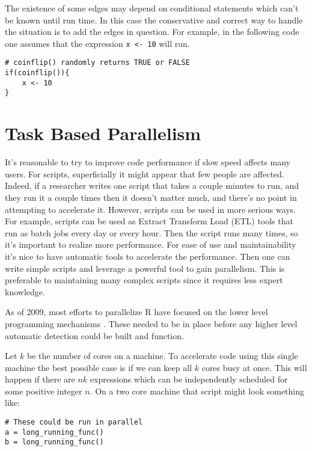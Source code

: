 \documentclass[12pt]{article}
\begin{document}
The existence of some edges may depend on conditional statements which can't
be known until run time. In this case the conservative and correct way to
handle the situation is to add the edges in question. For example, in the
following code one assumes that the expression \texttt{x <- 10} will run.

\begin{verbatim}
# coinflip() randomly returns TRUE or FALSE
if(coinflip()){
    x <- 10
}
\end{verbatim}

\section{Task Based Parallelism}

It's reasonable to try to improve code performance if slow speed affects
many users. For scripts, superficially it might appear that few people are
affected. Indeed, if a researcher writes one script that takes a couple
minutes to run, and they run it a couple times then it doesn't matter much,
and there's no point in attempting to accelerate it.  However, 
scripts can be used in more serious ways.  For example, scripts
can be used as Extract Transform Load (ETL) tools that run as batch jobs
every day or every hour. Then the script runs many times, so it's important
to realize more performance. For ease of use and maintainability it's nice
to have automatic tools to accelerate the performance. Then one can write
simple scripts and leverage a powerful tool to gain parallelism. This is
preferable to maintaining many complex scripts since it requires less
expert knowledge.

As of 2009, most efforts to parallelize R have focused on the lower level
programming mechanisms \cite{schmidberger2009state}. These needed to be in
place before any higher level automatic detection could be built and
function.

Let $k$ be the number of cores on a machine.
To accelerate code using this single machine the best possible case is if
we can keep all $k$ cores busy at once. This will happen if there are $nk$
expressions which can be independently scheduled for some positive integer
$n$. 
On a two core machine that script might look something like:

\begin{verbatim}
# These could be run in parallel
a = long_running_func()
b = long_running_func()
\end{verbatim}
\end{document}
